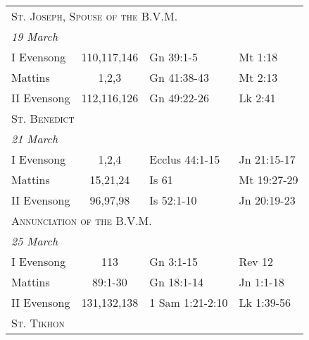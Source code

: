 \begin{longtable}{l c l l}
\multicolumn{4}{l}{\textsc{St. Joseph, Spouse of the B.V.M.}}\\
\multicolumn{4}{l}{\textit{19 March}}\\
\hspace{1em} I Evensong&110,117,146&Gn 39:1-5&Mt 1:18\\
\hspace{1em} Mattins&1,2,3&Gn 41:38-43&Mt 2:13\\
\hspace{1em} II Evensong&112,116,126&Gn 49:22-26&Lk 2:41\\
\multicolumn{4}{l}{\textsc{St. Benedict}}\\
\multicolumn{4}{l}{\textit{21 March}}\\
\hspace{1em} I Evensong&1,2,4&Ecclus 44:1-15&Jn 21:15-17\\
\hspace{1em} Mattins&15,21,24&Is 61&Mt 19:27-29\\
\hspace{1em} II Evensong&96,97,98&Is 52:1-10&Jn 20:19-23\\
%
%
\multicolumn{4}{l}{\textsc{Annunciation of the B.V.M.}}\\
\multicolumn{4}{l}{\textit{25 March}}\\
\hspace{1em} I Evensong&113&Gn 3:1-15&Rev 12\\
\hspace{1em} Mattins&89:1-30&Gn 18:1-14&Jn 1:1-18\\
\hspace{1em} II Evensong&131,132,138&1 Sam 1:21-2:10&Lk 1:39-56\\
\multicolumn{4}{l}{\textsc{St. Tikhon}}\\

\end{longtable}
